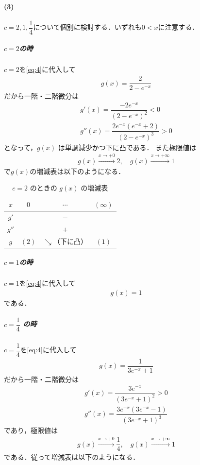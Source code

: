 \documentclass[../../main.tex]{subfiles}
\begin{document}
\paragraph{(3)}

$c=2,1,\dfrac{1}{4}$について個別に検討する．いずれも$0<x$に注意する．

\subparagraph{$c=2$の時}

$c=2$を\cref{eq:4}に代入して
\begin{align}
  g(x) = \dfrac{2}{2-e^{-x}}
\end{align}
だから一階・二階微分は
\begin{align}
  g'(x) = \dfrac{-2e^{-x}}{(2-e^{-x})^2} < 0 \\
  g''(x) = \dfrac{2e^{-x}(e^{-x}+2)}{(2-e^{-x})^3} > 0
\end{align}
となって，$g(x)$ は単調減少かつ下に凸である．
また極限値は
\begin{align}
  g(x) \xrightarrow{x \to +0} 2, \quad g(x) \xrightarrow{x \to +\infty} 1
\end{align}
で$g(x)$の増減表は以下のようになる．

\begin{table}[htb]
  \centering
  \caption{$c=2$ のときの $g(x)$ の増減表}
  \label{tab:gx_c2_monotonicity}
  \renewcommand{\arraystretch}{1.4}
  \begin{tabular}{|c|c|c|c|}
    \hline
    $x$   & $0$ & $\cdots$     & $(\infty)$ \\ \hline
    $g'$  &     & $-$          &            \\ \hline
    $g''$ &     & $+$          &            \\ \hline
    $g$   & $(2)$ & $\searrow$（下に凸） & $(1)$ \\ \hline
  \end{tabular}
\end{table}

\subparagraph{$c=1$の時}

$c=1$を\cref{eq:4}に代入して
\begin{align}
  g(x) = 1
\end{align}
である．

\subparagraph{$c=\dfrac{1}{4}$ の時}

$c=\dfrac{1}{4}$を\cref{eq:4}に代入して
\begin{align}
  g(x) = \dfrac{1}{3e^{-x}+1}
\end{align}
だから一階・二階微分は
\begin{align}
  g'(x) = \dfrac{3e^{-x}}{(3e^{-x}+1)^2} > 0 \\
  g''(x) = \dfrac{3e^{-x}(3e^{-x}-1)}{(3e^{-x}+1)^3}
\end{align}
であり，極限値は
\begin{align}
  g(x) \xrightarrow{x \to +0} \dfrac{1}{4}, \quad g(x) \xrightarrow{x \to +\infty} 1
\end{align}
である．従って増減表は以下のようになる．
\end{document}
